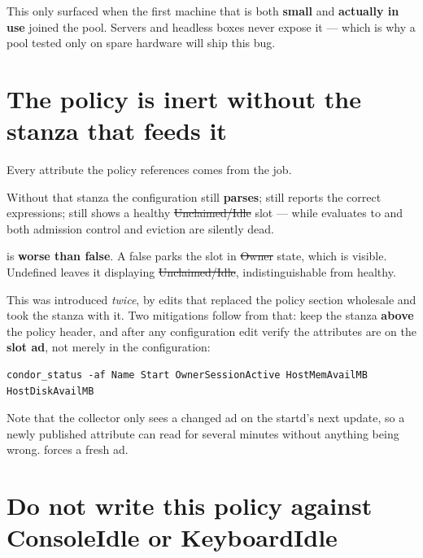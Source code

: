 \begin{keypoint}
This only surfaced when the first machine that is both \textbf{small} and
\textbf{actually in use} joined the pool. Servers and headless boxes never expose
it --- which is why a pool tested only on spare hardware will ship this bug.
\end{keypoint}

\section{The policy is inert without the stanza that feeds it}
\label{sec:inert}

Every attribute the policy references comes from the  job.

\begin{trap}
Without that stanza the configuration still \textbf{parses}; 
still reports the correct expressions;  still shows a healthy
\st{Unclaimed/Idle} slot --- while  evaluates to  and both
admission control and eviction are silently dead.
\end{trap}

 is \textbf{worse than false}. A false  parks the slot in
\st{Owner} state, which is visible. Undefined leaves it displaying
\st{Unclaimed/Idle}, indistinguishable from healthy.

This was introduced \emph{twice}, by edits that replaced the policy section
wholesale and took the stanza with it. Two mitigations follow from that: keep the
stanza \textbf{above} the policy header, and after any configuration edit verify
the attributes are on the \textbf{slot ad}, not merely in the configuration:

\begin{lstlisting}[style=term]
condor_status -af Name Start OwnerSessionActive HostMemAvailMB HostDiskAvailMB
\end{lstlisting}

Note that the collector only sees a changed ad on the startd's next update, so a
newly published attribute can read  for several minutes without
anything being wrong.  forces a fresh ad.

\section{Do not write this policy against ConsoleIdle or KeyboardIdle}
\label{sec:console}

